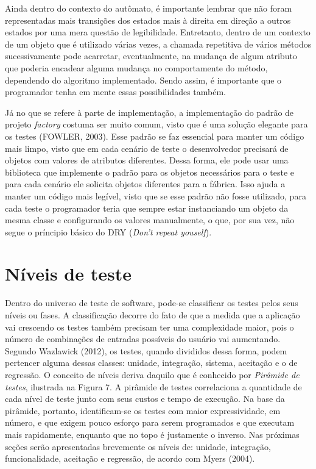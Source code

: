 \documentclass[
    12pt,       %
    openright,      %
    twoside,      %
    a4paper,      %
    english,      %
    french,       %
    spanish,      %
    brazil,       %
    ]{abntex2}
\begin{document}
          Ainda dentro do contexto do autômato, é importante lembrar que não foram representadas
          mais transições dos estados mais à direita em direção a outros estados por uma mera
          questão de legibilidade. Entretanto, dentro de um contexto de um objeto que é utilizado
          várias vezes, a chamada repetitiva de vários métodos sucessivamente pode acarretar,
          eventualmente, na mudança de algum atributo que poderia encadear alguma mudança no
          comportamente do método, dependendo do algoritmo implementado. Sendo assim, é importante
          que o programador tenha em mente essas possibilidades também.

          Já no que se refere à parte de implementação, a implementação do padrão de projeto
          \textit{factory} costuma ser muito comum, visto que é uma solução elegante
          para os testes (FOWLER, 2003). Esse padrão se faz essencial para manter um código mais limpo,
          visto que em cada cenário de teste o desenvolvedor precisará de objetos com valores de
          atributos diferentes. Dessa forma, ele pode usar uma biblioteca que implemente
          o padrão para os objetos necessários para o teste e para cada cenário ele solicita
          objetos diferentes para a fábrica. Isso ajuda a manter um código mais legível, visto
          que se esse padrão não fosse utilizado, para cada teste o programador teria que sempre
          estar instanciando um objeto da mesma classe e configurando os valores manualmente,
          o que, por sua vez, não segue o príncipio básico do DRY (\textit{Don't repeat youself}).

      \section{Níveis de teste}
          Dentro do universo de teste de software, pode-se classificar os testes pelos seus
          níveis ou fases. A classificação decorre do fato de que a medida que a aplicação
          vai crescendo os testes também precisam ter uma complexidade maior, pois o número
          de combinações de entradas possíveis do usuário vai aumentando. Segundo Wazlawick (2012),
          os testes, quando divididos dessa forma, podem pertencer alguma
          dessas classes: unidade, integração, sistema, aceitação e o de regressão. O
          conceito de níveis deriva daquilo que é conhecido por \textit{Pirâmide de testes},
          ilustrada na Figura 7. A pirâmide de testes correlaciona a quantidade de cada nível
          de teste junto com seus custos e tempo de execução. Na base da pirâmide, portanto,
          identificam-se os testes com maior expressividade, em número, e que exigem pouco
          esforço para serem programados e que executam mais rapidamente, enquanto que no topo
          é justamente o inverso. Nas próximas seções serão apresentadas brevemente os níveis de:
          unidade, integração, funcionalidade, aceitação e regressão, de acordo com Myers (2004).
\end{document}
